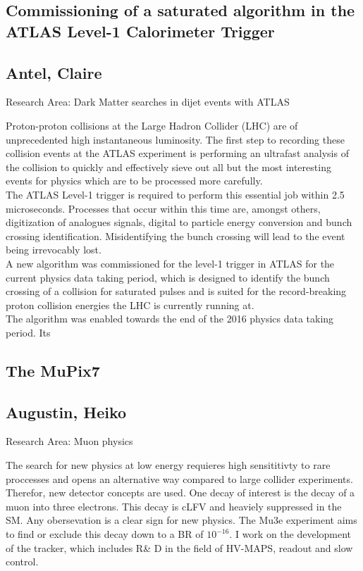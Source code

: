 \subsection*{\centering \large Commissioning of a saturated algorithm in the ATLAS Level-1 Calorimeter Trigger}
\subsection*{\centering \normalsize Antel, Claire}
Research Area: Dark Matter searches in dijet events with ATLAS\newline

\noindent Proton-proton collisions at the Large Hadron Collider (LHC) are of unprecedented high instantaneous luminosity. The first step to recording these collision events at the ATLAS experiment is performing an ultrafast analysis of the collision to quickly and effectively sieve out all but the most interesting events for physics which are to be processed more carefully.\\The ATLAS Level-1 trigger is required to perform this essential job within 2.5 microseconds. Processes that occur within this time are, amongst others, digitization of analogues signals, digital to particle energy conversion and bunch crossing identification. Misidentifying the bunch crossing will lead to the event being irrevocably lost.\\A new algorithm was commissioned for the level-1 trigger in ATLAS for the current physics data taking period, which is designed to identify the bunch crossing of a collision for saturated pulses and is suited for the record-breaking proton collision energies the LHC is currently running at. \\The algorithm was enabled towards the end of the 2016 physics data taking period. Its 

 

\subsection*{\centering \large The MuPix7}
\subsection*{\centering \normalsize Augustin, Heiko}
Research Area: Muon physics \newline

\noindent The search for new physics at low energy requieres high sensititivty to rare proccesses and opens an alternative way compared to large collider experiments. Therefor, new detector concepts are used. One decay of interest is the decay of a muon into three electrons. This decay is cLFV and heaviely suppressed in the SM. Any obersevation is a clear sign for new physics. The Mu3e experiment aims to find or exclude this decay down to a BR of $10^{-16}$. I work on the development of the tracker, which includes R\& D in the field of HV-MAPS, readout and slow control.
\newpage

